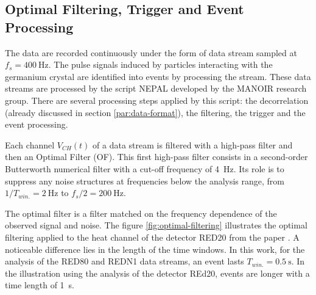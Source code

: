\subsection{Optimal Filtering, Trigger and Event Processing}
\label{par:optimal-filtering}
\label{par:trigger}


The data are recorded continuously under the form of data stream sampled at $f_s=\SI{400}{\Hz}$. The pulse signals induced by particles interacting with the germanium crystal are identified into events by processing the stream. These data streams are processed by the script NEPAL developed by the MANOIR research group. There are several processing steps applied by this script: the decorrelation (already discussed in section \ref{par:data-format}), the filtering, the trigger and the event processing. 

Each channel $V_{CH}(t)$ of a data stream is filtered with a high-pass filter and then an Optimal Filter (OF). This first high-pass filter consists in a second-order Butterworth numerical filter with a cut-off frequency of \SI{4}{\Hz}. Its role is to suppress any noise structures at frequencies below the analysis range, from $1/T_{win.}=\SI{2}{\Hz}$ to $f_s/2=\SI{200}{\Hz}$. 

The optimal filter is a filter matched on the frequency dependence of the observed signal and noise. The figure \ref{fig:optimal-filtering} illustrates the optimal filtering applied to the heat channel of the detector RED20 from the paper \cite{Armengaud:2019kfj}. A noticeable difference lies in the length of the time windows. In this work, for the analysis of the RED80 and REDN1 data streams, an event lasts $T_{win.} = \SI{0.5}{\s}$. In the illustration using the analysis of the detector REd20, events are longer with a time length of \SI{1}{\s}.

